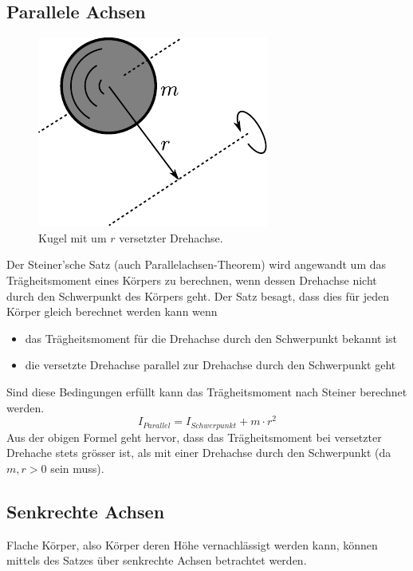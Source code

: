 \subsection{Parallele Achsen}
\begin{figure}[h!]
	\centering
	\includegraphics[scale=0.7]{steiner.pdf}
	\caption{Kugel mit um $r$ versetzter Drehachse.}
	\label{fig:steiner}
\end{figure}

\noindent
Der Steiner'sche Satz (auch Parallelachsen-Theorem) wird angewandt um
das Trägheitsmoment eines Körpers zu berechnen, wenn dessen Drehachse nicht
durch den Schwerpunkt des Körpers geht. Der Satz besagt, dass dies für 
jeden Körper gleich berechnet werden kann wenn
\begin{itemize}
	\item das Trägheitsmoment für die Drehachse durch den Schwerpunkt
		bekannt ist
	\item die versetzte Drehachse parallel zur Drehachse durch den
		Schwerpunkt geht
\end{itemize}
Sind diese Bedingungen erfüllt kann das Trägheitsmoment nach Steiner
berechnet werden.
\[ \boxed{ I_{Parallel} = I_{Schwerpunkt} + m \cdot r^2 } \]
Aus der obigen Formel geht hervor, dass das Trägheitsmoment bei versetzter
Drehache stets grösser ist, als mit einer Drehachse durch den Schwerpunkt
(da $m,r>0$ sein muss).

\subsection{Senkrechte Achsen}
Flache Körper, also Körper deren Höhe vernachlässigt werden kann, können
mittels des Satzes über senkrechte Achsen betrachtet werden.


